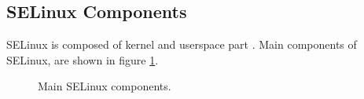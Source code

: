 \subsection{SELinux Components}
SELinux is composed of kernel and userspace part \cite[pp.~19--22]{tsn}. Main
components of SELinux, are shown in figure \ref{fig:selinuxcomponents}.

\begin{figure}
    \centering
    \label{fig:selinuxcomponents}
    
    \caption{Main SELinux components.}
\end{figure}

